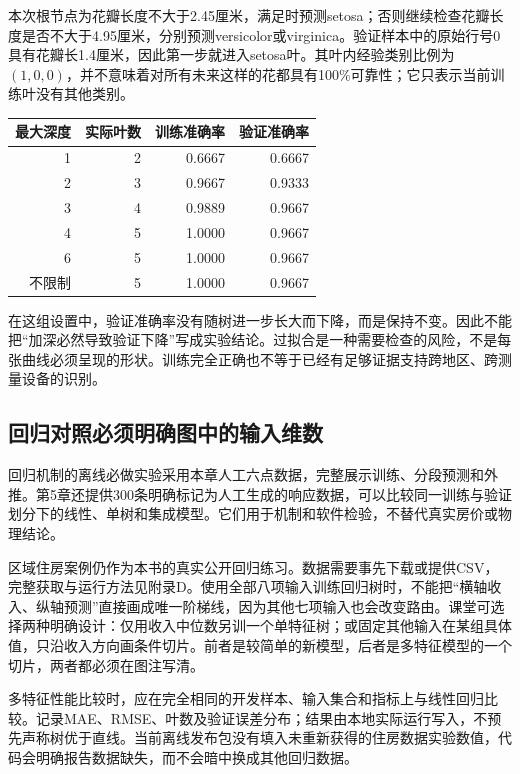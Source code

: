 本次根节点为花瓣长度不大于2.45厘米，满足时预测setosa；否则继续检查花瓣长度是否不大于4.95厘米，分别预测versicolor或virginica。验证样本中的原始行号0具有花瓣长1.4厘米，因此第一步就进入setosa叶。其叶内经验类别比例为 $(1,0,0)$，并不意味着对所有未来这样的花都具有100\%可靠性；它只表示当前训练叶没有其他类别。


\begin{center}\small
\begin{tabular}{rrrr}\toprule
最大深度&实际叶数&训练准确率&验证准确率\\\midrule
1&2&0.6667&0.6667\\
2&3&0.9667&0.9333\\
3&4&0.9889&0.9667\\
4&5&1.0000&0.9667\\
6&5&1.0000&0.9667\\
不限制&5&1.0000&0.9667\\\bottomrule
\end{tabular}\end{center}

在这组设置中，验证准确率没有随树进一步长大而下降，而是保持不变。因此不能把“加深必然导致验证下降”写成实验结论。过拟合是一种需要检查的风险，不是每张曲线必须呈现的形状。训练完全正确也不等于已经有足够证据支持跨地区、跨测量设备的识别。

\subsection{回归对照必须明确图中的输入维数}
回归机制的离线必做实验采用本章人工六点数据，完整展示训练、分段预测和外推。第5章还提供300条明确标记为人工生成的响应数据，可以比较同一训练与验证划分下的线性、单树和集成模型。它们用于机制和软件检验，不替代真实房价或物理结论。

区域住房案例仍作为本书的真实公开回归练习。数据需要事先下载或提供CSV，完整获取与运行方法见附录D。使用全部八项输入训练回归树时，不能把“横轴收入、纵轴预测”直接画成唯一阶梯线，因为其他七项输入也会改变路由。课堂可选择两种明确设计：仅用收入中位数另训一个单特征树；或固定其他输入在某组具体值，只沿收入方向画条件切片。前者是较简单的新模型，后者是多特征模型的一个切片，两者都必须在图注写清。

多特征性能比较时，应在完全相同的开发样本、输入集合和指标上与线性回归比较。记录MAE、RMSE、叶数及验证误差分布；结果由本地实际运行写入，不预先声称树优于直线。当前离线发布包没有填入未重新获得的住房数据实验数值，代码会明确报告数据缺失，而不会暗中换成其他回归数据。

